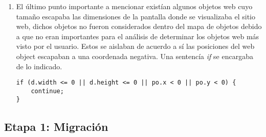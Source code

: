 \begin{enumerate}
		\item El último punto importante a mencionar existían algunos objetos web cuyo tamaño 
		escapaba las dimensiones de la pantalla donde se visualizaba el sitio web, dichos objetos
		no fueron considerados dentro del mapa de objetos debido a que no eran importantes 
		para el análisis de determinar los objetos web más visto por el usuario. Estos 
		se aislaban de acuerdo a sí las posiciones del web object escapaban a una coordenada
		negativa. Una sentencía \textit{if} se encargaba de lo indicado. 
		\begin{lstlisting}[style=Java, caption={Condición de borde.}]
if (d.width <= 0 || d.height <= 0 || po.x < 0 || po.y < 0) {
	continue;
}
\end{lstlisting}
        \end{enumerate}
        
	\subsection{Etapa 1: Migración}
	

